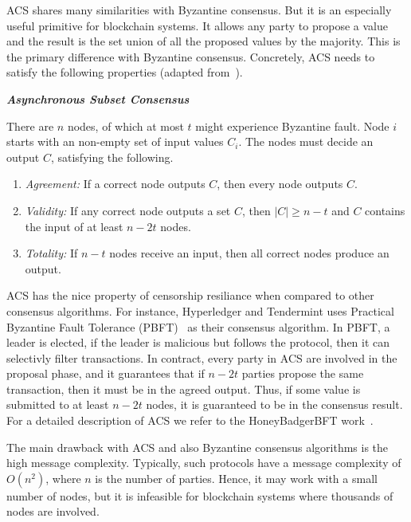 ACS shares many similarities with Byzantine consensus.
But it is an especially useful primitive for blockchain systems.
It allows any party to propose a value and the result is the set union of all the proposed values by the majority.
This is the primary difference with Byzantine consensus.
Concretely, ACS needs to satisfy the following properties (adapted from~\cite{miller2016honey}).
\begin{definition}
\label{def:acs}
\textbf{\emph{Asynchronous Subset Consensus}}

There are $n$ nodes, of which at most $t$ might experience Byzantine fault.
Node $i$ starts with an non-empty set of input values $C_i$.
The nodes must decide an output $C$, satisfying the following.
\begin{enumerate}
    \item \emph{Agreement:}
        If a correct node outputs $C$, then every node outputs $C$.
    \item \emph{Validity:}
        If any correct node outputs a set $C$,
        then $|C| \ge n - t$ and $C$ contains the input of at least $n - 2t$ nodes.
    \item \emph{Totality:}
        If $n - t$ nodes receive an input, then all correct nodes produce an output.
\end{enumerate}
\end{definition}

ACS has the nice property of censorship resiliance when compared to other consensus algorithms.
For instance, Hyperledger and Tendermint uses Practical Byzantine Fault Tolerance (PBFT)~\cite{castro1999practical} as their consensus algorithm.
In PBFT, a leader is elected, if the leader is malicious but follows the protocol, then it can selectivly filter transactions.
In contract, every party in ACS are involved in the proposal phase,
and it guarantees that if $n - 2t$ parties propose the same transaction, then it must be in the agreed output.
Thus, if some value is submitted to at least $n - 2t$ nodes, it is guaranteed to be in the consensus result.
For a detailed description of ACS we refer to the HoneyBadgerBFT work~\cite{miller2016honey}.

The main drawback with ACS and also Byzantine consensus algorithms is the high message complexity.
Typically, such protocols have a message complexity of $O(n^2)$, where $n$ is the number of parties.
Hence, it may work with a small number of nodes,
but it is infeasible for blockchain systems where thousands of nodes are involved.

